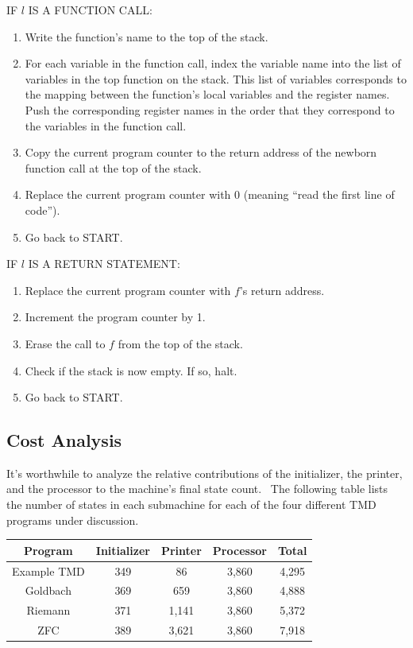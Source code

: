 \documentclass[11pt]{article}
\newcommand{\statenum}{7,918 }
\newcommand{\gbstatenum}{4,888 }
\newcommand{\rmstatenum}{5,372 }
\begin{document}
\noindent IF $l$ IS A FUNCTION CALL:
\begin{enumerate}
\item Write the function's name to the top of the stack.
\item For each variable in the function call, index the variable name into the list of variables in the top function on the stack. This list of variables corresponds to the mapping between the function's local variables and the register names. Push the corresponding register names in the order that they correspond to the variables in the function call.
\item Copy the current program counter to the return address of the newborn function call at the top of the stack.
\item Replace the current program counter with 0 (meaning ``read the first line of code'').
\item Go back to START.
\end{enumerate}

\noindent IF $l$ IS A RETURN STATEMENT:
\begin{enumerate}
\item Replace the current program counter with $f$'s return address.
\item Increment the program counter by 1.
\item Erase the call to $f$ from the top of the stack.
\item Check if the stack is now empty. If so, halt.
\item Go back to START.
\end{enumerate}

\subsection{Cost Analysis} \label{sec:cost}

It's worthwhile to analyze the relative contributions of the initializer, the printer, and the processor to the machine's final state count. \ The following table lists the number of states in each submachine for each of the four different TMD programs under discussion.

\begin{center}
    \begin{tabular}{||c c c c c||}
    \hline
    Program & Initializer & Printer & Processor & Total \\ [0.5ex]
    \hline\hline
    Example TMD & 349 & 86 & 3,860 & 4,295 \\
    \hline
    Goldbach & 369 & 659 & 3,860 & \gbstatenum \\
    \hline
    Riemann & 371 & 1,141 & 3,860 & \rmstatenum \\
    \hline
    ZFC & 389 & 3,621 & 3,860 & \statenum \\
    \hline
    \end{tabular}
\end{center}
\end{document}
